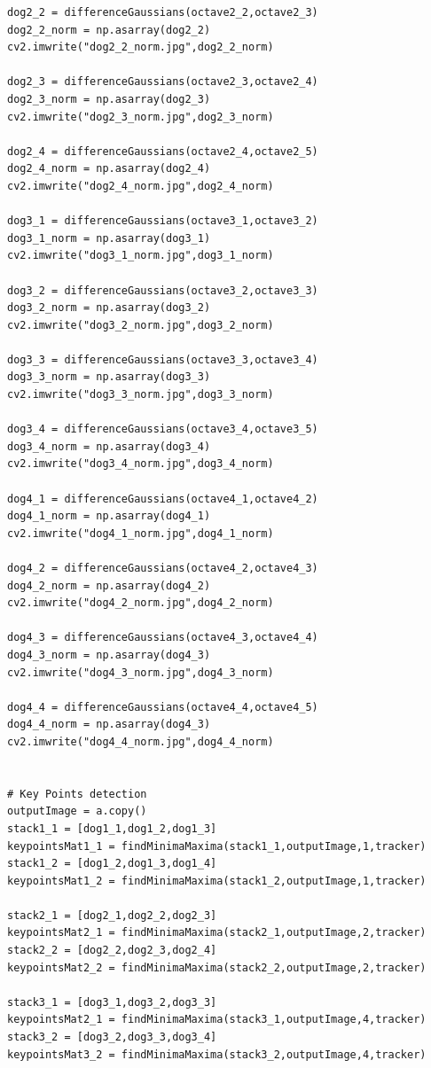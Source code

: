 \documentclass[12pt]{article}
\newenvironment{QandA}
{
	\begin{enumerate}[label=\normalfont\arabic*.,leftmargin=2em,rightmargin=2em]\normalfont
	}
	{
	\end{enumerate}
}
\newenvironment{codelalala}{}{}
\newenvironment{answered}{\setlength{\parindent}{1em}\par\normalfont}{}
\begin{document}
\begin{QandA}
\begin{answered}
\begin{codelalala}
\begin{verbatim}
dog2_2 = differenceGaussians(octave2_2,octave2_3)
dog2_2_norm = np.asarray(dog2_2)
cv2.imwrite("dog2_2_norm.jpg",dog2_2_norm)

dog2_3 = differenceGaussians(octave2_3,octave2_4)
dog2_3_norm = np.asarray(dog2_3)
cv2.imwrite("dog2_3_norm.jpg",dog2_3_norm)

dog2_4 = differenceGaussians(octave2_4,octave2_5)
dog2_4_norm = np.asarray(dog2_4)
cv2.imwrite("dog2_4_norm.jpg",dog2_4_norm)

dog3_1 = differenceGaussians(octave3_1,octave3_2)
dog3_1_norm = np.asarray(dog3_1)
cv2.imwrite("dog3_1_norm.jpg",dog3_1_norm)

dog3_2 = differenceGaussians(octave3_2,octave3_3)
dog3_2_norm = np.asarray(dog3_2)
cv2.imwrite("dog3_2_norm.jpg",dog3_2_norm)

dog3_3 = differenceGaussians(octave3_3,octave3_4)
dog3_3_norm = np.asarray(dog3_3)
cv2.imwrite("dog3_3_norm.jpg",dog3_3_norm)

dog3_4 = differenceGaussians(octave3_4,octave3_5)
dog3_4_norm = np.asarray(dog3_4)
cv2.imwrite("dog3_4_norm.jpg",dog3_4_norm)

dog4_1 = differenceGaussians(octave4_1,octave4_2)
dog4_1_norm = np.asarray(dog4_1)
cv2.imwrite("dog4_1_norm.jpg",dog4_1_norm)

dog4_2 = differenceGaussians(octave4_2,octave4_3)
dog4_2_norm = np.asarray(dog4_2)
cv2.imwrite("dog4_2_norm.jpg",dog4_2_norm)

dog4_3 = differenceGaussians(octave4_3,octave4_4)
dog4_3_norm = np.asarray(dog4_3)
cv2.imwrite("dog4_3_norm.jpg",dog4_3_norm)

dog4_4 = differenceGaussians(octave4_4,octave4_5)
dog4_4_norm = np.asarray(dog4_3)
cv2.imwrite("dog4_4_norm.jpg",dog4_4_norm)


# Key Points detection
outputImage = a.copy()
stack1_1 = [dog1_1,dog1_2,dog1_3]
keypointsMat1_1 = findMinimaMaxima(stack1_1,outputImage,1,tracker)
stack1_2 = [dog1_2,dog1_3,dog1_4]
keypointsMat1_2 = findMinimaMaxima(stack1_2,outputImage,1,tracker)

stack2_1 = [dog2_1,dog2_2,dog2_3]
keypointsMat2_1 = findMinimaMaxima(stack2_1,outputImage,2,tracker)
stack2_2 = [dog2_2,dog2_3,dog2_4]
keypointsMat2_2 = findMinimaMaxima(stack2_2,outputImage,2,tracker)

stack3_1 = [dog3_1,dog3_2,dog3_3]
keypointsMat2_1 = findMinimaMaxima(stack3_1,outputImage,4,tracker)
stack3_2 = [dog3_2,dog3_3,dog3_4]
keypointsMat3_2 = findMinimaMaxima(stack3_2,outputImage,4,tracker)


\end{verbatim}
\end{codelalala}
\end{answered}
\end{QandA}
\end{document}
